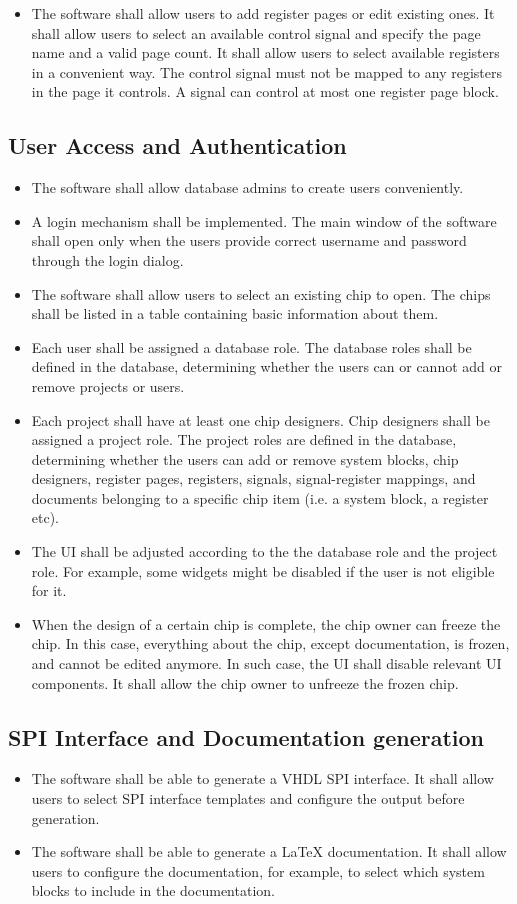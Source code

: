 \begin{itemize}
\item The software shall allow users to add register pages or edit existing ones. It shall allow users to select an available control signal and specify the page name and a valid page count. It shall allow users to select available registers in a convenient way. The control signal must not be mapped to any registers in the page it controls. A signal can control at most one register page block.
\end{itemize}
\subsection{User Access and Authentication}
\begin{itemize}
\item The software shall allow database admins to create users conveniently.
\item A login mechanism shall be implemented. The main window of the software shall open only when the users provide correct username and password through the login dialog.
\item The software shall allow users to select an existing chip to open. The chips shall be listed in a table containing basic information about them.
\item Each user shall be assigned a database role. The database roles shall be defined in the database, determining whether the users can or cannot add or remove projects or users. 
\item Each project shall have at least one chip designers. Chip designers shall be assigned a project role. The project roles are defined in the database, determining whether the users can add or remove system blocks, chip designers, register pages, registers, signals, signal-register mappings, and documents belonging to a specific chip item (i.e. a system block, a register etc). 
\item The UI shall be adjusted according to the the database role and the project role. For example, some widgets might be disabled if the user is not eligible for it.
\item When the design of a certain chip is complete, the chip owner can freeze the chip. In this case, everything about the chip, except documentation, is frozen, and cannot be edited anymore. In such case, the UI shall disable relevant UI components. It shall allow the chip owner to unfreeze the frozen chip.
\end{itemize}
\subsection{SPI Interface and Documentation generation}
\begin{itemize}
\item The software shall be able to generate a VHDL SPI interface. It shall allow users to select SPI interface templates and configure the output before generation.
\item The software shall be able to generate a LaTeX documentation. It shall allow users to configure the documentation, for example, to select which system blocks to include in the documentation.
\end{itemize}
